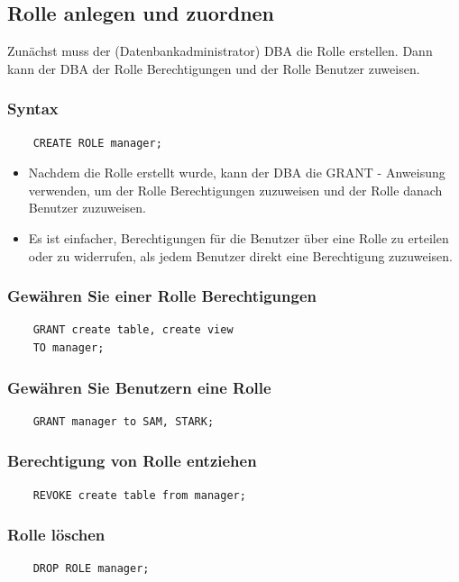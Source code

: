\subsection{Rolle anlegen und zuordnen}
Zunächst muss der (Datenbankadministrator) DBA die Rolle erstellen. Dann kann der DBA der Rolle Berechtigungen und der Rolle Benutzer zuweisen.

\subsubsection{Syntax}
\begin{lstlisting}
    CREATE ROLE manager;
\end{lstlisting}

\begin{itemize}
    \item Nachdem die Rolle erstellt wurde, kann der DBA die GRANT - Anweisung verwenden, um der Rolle Berechtigungen zuzuweisen und der Rolle danach Benutzer zuzuweisen.
    \item Es ist einfacher, Berechtigungen für die Benutzer über eine Rolle zu erteilen oder zu widerrufen, als jedem Benutzer direkt eine Berechtigung zuzuweisen.
\end{itemize}

\subsubsection{Gewähren Sie einer Rolle Berechtigungen}
\begin{lstlisting}
    GRANT create table, create view
    TO manager;
\end{lstlisting}

\subsubsection{Gewähren Sie Benutzern eine Rolle}
\begin{lstlisting}
    GRANT manager to SAM, STARK;
\end{lstlisting}

\subsubsection{Berechtigung von Rolle entziehen}
\begin{lstlisting}
    REVOKE create table from manager;
\end{lstlisting}

\subsubsection{Rolle löschen}
\begin{lstlisting}
    DROP ROLE manager;
\end{lstlisting}

